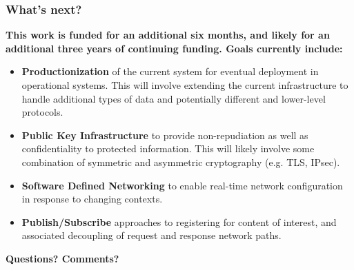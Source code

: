 \documentclass[t,handout]{beamer}
\begin{document}
\begin{frame}
\frametitle{What's next?}
{\bf This work is funded for an additional six months, and likely for an additional three years of continuing funding.  Goals currently include:}
\begin{small}
\begin{itemize}
\item {\bf Productionization} of the current system for eventual deployment in operational systems.  This will involve extending the current infrastructure to handle additional types of data and potentially different and lower-level protocols.
\item {\bf Public Key Infrastructure} to provide non-repudiation as well as confidentiality to protected information.  This will likely involve some combination of symmetric and asymmetric cryptography (e.g. TLS, IPsec).
\item {\bf Software Defined Networking} to enable real-time network configuration in response to changing contexts.
\item {\bf Publish/Subscribe} approaches to registering for content of interest, and associated decoupling of request and response network paths.
\end{itemize}
\end{small}
\end{frame}

%
%
%
%
%

%

\begin{frame}[c]
\begin{center}
\textbf{Questions? Comments?}
\end{center}
\end{frame}

%
\end{document}
